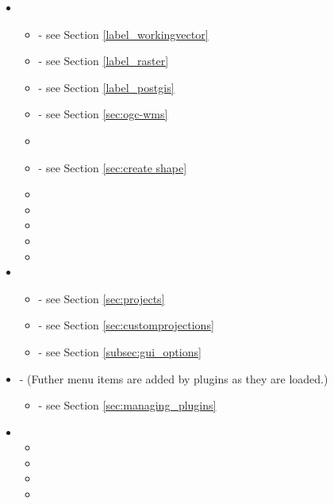 \begin{itemize}
\item {}
\begin{itemize}
\item {}       - see Section \ref{label_workingvector}
\item {}       - see Section \ref{label_raster}
\item {}      - see Section \ref{label_postgis}
\item {}          - see Section \ref{sec:ogc-wms}
\item {}
\item {}          	- see Section \ref{sec:create shape}
\item {}
\item {}
\item {}
\item {}
\item {}
\end{itemize}

\item {}
\begin{itemize}
\item {}  - see Section \ref{sec:projects}
\item {}   - see Section \ref{sec:customprojections}
\item {}             - see Section \ref{subsec:gui_options}
\end{itemize}

\item {} - (Futher menu items are added by plugins as they are loaded.)
\begin{itemize}
\item {}          	   - see Section \ref{sec:managing_plugins}
\end{itemize}          	

\item {}
\begin{itemize}
\item {}
\item {}
\item {}
\item {}
\end{itemize}

\end{itemize}

